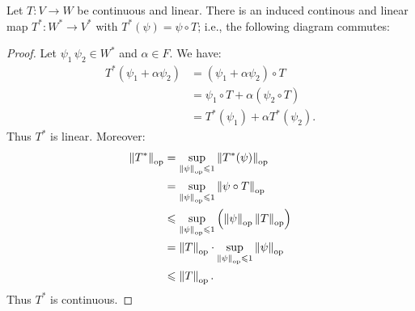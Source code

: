     \begin{lemma}
        Let $T:V \rightarrow W$ be continuous and linear. There is an induced continous and linear map $T^\ast:W^\ast \rightarrow V^\ast$ with $T^\ast (\psi) = \psi \circ T$; i.e., the following diagram commutes:
            \begin{center}
            \end{center}
    \end{lemma}
        \begin{proof}
            Let $\psi_1\,\psi_2 \in W^\ast$ and $\alpha \in F$. We have:
                \begin{equation*}
                \begin{split}
                    T^\ast(\psi_1 + \alpha \psi_2)
                    & = (\psi_1 + \alpha \psi_2) \circ T \\
                    & = \psi_1 \circ T + \alpha (\psi_2 \circ T) \\
                    & = T^\ast(\psi_1) + \alpha T^\ast(\psi_2).
                \end{split}
                \end{equation*}
            Thus $T^\ast$ is linear. Moreover:
                \begin{equation*}
                \begin{split}
                    \left\lVert T^\ast \right\rVert_{\operatorname{op}}
                    & = \sup_{\left\lVert \psi \right\rVert_{\operatorname{op}} \leqslant 1}\left\lVert T^\ast(\psi) \right\rVert_{\operatorname{op}} \\
                    & = \sup_{\left\lVert \psi \right\rVert_{\operatorname{op}} \leqslant 1}\left\lVert \psi \circ T \right\rVert_{\operatorname{op}} \\
                    & \leqslant \sup_{\left\lVert \psi \right\rVert_{\operatorname{op}} \leqslant 1}\left( \left\lVert \psi \right\rVert_{\operatorname{op}} \left\lVert T \right\rVert_{\operatorname{op}} \right)\\
                    & = \left\lVert T \right\rVert_{\operatorname{op}} \cdot \sup_{\left\lVert \psi \right\rVert_{\operatorname{op}} \leqslant 1}\left\lVert \psi \right\rVert_{\operatorname{op}} \\
                    & \leqslant \left\lVert T \right\rVert_{\operatorname{op}}.
                \end{split}
                \end{equation*}
            Thus $T^\ast$ is continuous.
        \end{proof}


